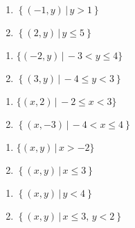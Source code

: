 \documentclass{ximera}
\begin{document}
\begin{multicols}{2}
\begin{enumerate}
\setcounter{enumi}{\value{HW}}

\item  $\left\{ \left(-1, y \right) \, | \, y > 1 \right\}$
\item  $\left\{ \left(2, y \right) \, | \, y \leq 5 \right\}$

\setcounter{HW}{\value{enumi}}
\end{enumerate}
\end{multicols}

\begin{multicols}{2}
\begin{enumerate}
\setcounter{enumi}{\value{HW}}

\item $\{ (-2, y) \, | \, -3 < y \leq 4\}$
\item  $\left\{ \left(3,y \right) \, | \, -4 \leq y < 3 \right\}$

\setcounter{HW}{\value{enumi}}
\end{enumerate}
\end{multicols}

\begin{multicols}{2}
\begin{enumerate}
\setcounter{enumi}{\value{HW}}

\item $\{ (x, 2) \, | \, -2 \leq x < 3 \}$
\item  $\left\{ \left(x,-3 \right) \, | \, -4 < x \leq 4 \right\}$

\setcounter{HW}{\value{enumi}}
\end{enumerate}
\end{multicols}

\begin{multicols}{2}
\begin{enumerate}
\setcounter{enumi}{\value{HW}}

\item $\{ (x, y) \, | \, x > -2 \}$
\item  $\left\{ \left(x,y \right) \, | \, x \leq 3 \right\}$

\setcounter{HW}{\value{enumi}}
\end{enumerate}
\end{multicols}

\begin{multicols}{2}
\begin{enumerate}
\setcounter{enumi}{\value{HW}}

\item  $\left\{ \left(x,y \right) \, | \, y < 4 \right\}$
\item  $\left\{ \left(x,y \right) \, | \, x \leq 3, \, y < 2 \right\}$

\setcounter{HW}{\value{enumi}}
\end{enumerate}
\end{multicols}
\end{document}
